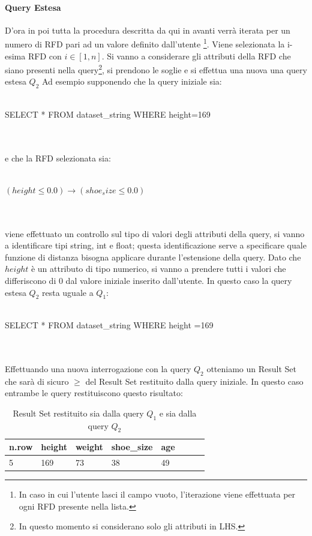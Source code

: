 \paragraph{Query Estesa}
D'ora in poi tutta la procedura descritta da qui in avanti verrà iterata per un numero di RFD pari ad un valore definito dall'utente \footnote{In caso in cui l'utente lasci il campo vuoto, l'iterazione viene effettuata per ogni RFD presente nella lista.}.
Viene selezionata la i-esima RFD con $i\in[1,n]$. 
Si vanno a considerare gli attributi della RFD che siano presenti nella query\footnote{In questo momento si considerano solo gli attributi in LHS.}, si prendono le soglie e si effettua una nuova una query estesa $Q_2$
Ad esempio supponendo che la query iniziale sia: 
\\~\\ 
\centerline{SELECT * FROM dataset{\_}string WHERE height=169} 
\\~\\
e che la RFD selezionata sia: 
\\~\\ 
\centerline{$(height \leq 0.0)  \rightarrow(shoe_size \leq 0.0)$}
\\~\\
viene effettuato un controllo sul tipo di valori degli attributi della query,
si vanno a identificare tipi string, int e float; questa identificazione serve a specificare quale funzione di distanza bisogna applicare durante l'estensione della query.
Dato che $height$ è un attributo di tipo numerico, si vanno a prendere tutti i valori che differiscono di 0 dal valore iniziale inserito dall'utente. In questo caso la query estesa $Q_2$ resta uguale a $Q_1$: 
\\~\\
\centerline{SELECT * FROM dataset{\_}string WHERE height =169} 
\\~\\
Effettuando una nuova interrogazione con la query $Q_2$ otteniamo un Result Set che sarà di sicuro $\geq$ del Result Set restituito dalla query iniziale.
In questo caso entrambe le query restituiscono questo risultato: \newline 
\begin{table}[H]
    \centering
    \begin{tabular}{l l l l l l l l}
    n.row   & height & weight & shoe{\_}size & age \\
    \hline
    5 & 169 & 73 & 38 & 49 \\
    \end{tabular}
    \caption{Result Set restituito sia dalla query $Q_1$ e sia dalla query $Q_2$ }
    \label{tab:sta_ext_result_set}
\end{table}
